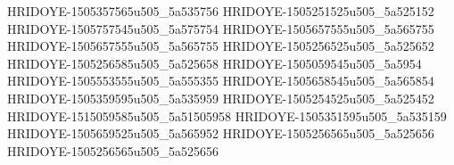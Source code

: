 HRIDOYE-1505357565u505_5a535756
HRIDOYE-1505251525u505_5a525152
HRIDOYE-1505757545u505_5a575754
HRIDOYE-1505657555u505_5a565755
HRIDOYE-1505657555u505_5a565755
HRIDOYE-1505256525u505_5a525652
HRIDOYE-1505256585u505_5a525658
HRIDOYE-1505059545u505_5a5954
HRIDOYE-1505553555u505_5a555355
HRIDOYE-1505658545u505_5a565854
HRIDOYE-1505359595u505_5a535959
HRIDOYE-1505254525u505_5a525452
HRIDOYE-1515059585u505_5a51505958
HRIDOYE-1505351595u505_5a535159
HRIDOYE-1505659525u505_5a565952
HRIDOYE-1505256565u505_5a525656
HRIDOYE-1505256565u505_5a525656
